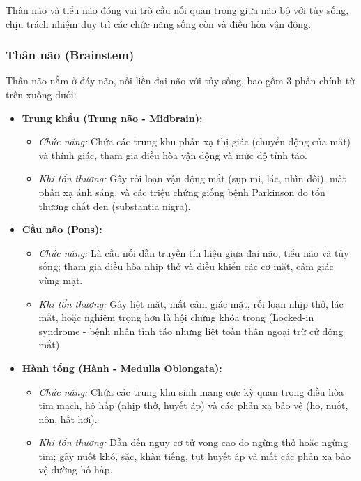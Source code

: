 Thân não và tiểu não đóng vai trò cầu nối quan trọng giữa não bộ với tủy sống, chịu trách nhiệm duy trì các chức năng sống còn và điều hòa vận động.

\subsubsection{Thân não (Brainstem)}

Thân não nằm ở đáy não, nối liền đại não với tủy sống, bao gồm 3 phần chính từ trên xuống dưới:

\begin{itemize}
    \item \textbf{Trung khẩu (Trung não - Midbrain):}
    \begin{itemize}
        \item \textit{Chức năng:} Chứa các trung khu phản xạ thị giác (chuyển động của mắt) và thính giác, tham gia điều hòa vận động và mức độ tỉnh táo.
        \item \textit{Khi tổn thương:} Gây rối loạn vận động mắt (sụp mi, lác, nhìn đôi), mất phản xạ ánh sáng, và các triệu chứng giống bệnh Parkinson do tổn thương chất đen (substantia nigra).
    \end{itemize}

    \item \textbf{Cầu não (Pons):}
    \begin{itemize}
        \item \textit{Chức năng:} Là cầu nối dẫn truyền tín hiệu giữa đại não, tiểu não và tủy sống; tham gia điều hòa nhịp thở và điều khiển các cơ mặt, cảm giác vùng mặt.
        \item \textit{Khi tổn thương:} Gây liệt mặt, mất cảm giác mặt, rối loạn nhịp thở, lác mắt, hoặc nghiêm trọng hơn là hội chứng khóa trong (Locked-in syndrome - bệnh nhân tỉnh táo nhưng liệt toàn thân ngoại trừ cử động mắt).
    \end{itemize}

    \item \textbf{Hành tổng (Hành - Medulla Oblongata):}
    \begin{itemize}
        \item \textit{Chức năng:} Chứa các trung khu sinh mạng cực kỳ quan trọng điều hòa tim mạch, hô hấp (nhịp thở, huyết áp) và các phản xạ bảo vệ (ho, nuốt, nôn, hắt hơi).
        \item \textit{Khi tổn thương:} Dẫn đến nguy cơ tử vong cao do ngừng thở hoặc ngừng tim; gây nuốt khó, sặc, khàn tiếng, tụt huyết áp và mất các phản xạ bảo vệ đường hô hấp.
    \end{itemize}
\end{itemize}

